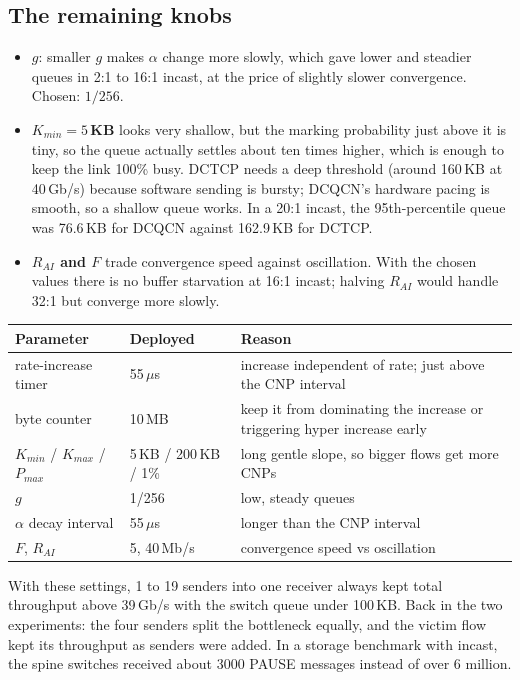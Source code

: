 \subsection{The remaining knobs}
\begin{itemize}
  \item \textbf{$g$}: smaller $g$ makes $\alpha$ change more slowly, which gave lower and steadier queues in 2:1 to 16:1 incast, at the price of slightly
        slower convergence. Chosen: $1/256$.
  \item \textbf{$K_{min} = 5$\,KB} looks very shallow, but the marking probability just above it is tiny, so the queue actually settles about ten times
        higher, which is enough to keep the link 100\% busy. DCTCP needs a deep threshold (around 160\,KB at 40\,Gb/s) because software sending is bursty;
        DCQCN's hardware pacing is smooth, so a shallow queue works. In a 20:1 incast, the 95th-percentile queue was 76.6\,KB for DCQCN against
        162.9\,KB for DCTCP.
  \item \textbf{$R_{AI}$ and $F$} trade convergence speed against oscillation. With the chosen values there is no buffer starvation at 16:1 incast;
        halving $R_{AI}$ would handle 32:1 but converge more slowly.
\end{itemize}

\begin{center}
\begin{tabularx}{\linewidth}{@{}llX@{}}
\toprule
Parameter & Deployed & Reason\\
\midrule
rate-increase timer & 55\,$\mu$s & increase independent of rate; just above the CNP interval\\
byte counter & 10\,MB & keep it from dominating the increase or triggering hyper increase early\\
$K_{min}$ / $K_{max}$ / $P_{max}$ & 5\,KB / 200\,KB / 1\% & long gentle slope, so bigger flows get more CNPs\\
$g$ & 1/256 & low, steady queues\\
$\alpha$ decay interval & 55\,$\mu$s & longer than the CNP interval\\
$F$, $R_{AI}$ & 5, 40\,Mb/s & convergence speed vs oscillation\\
\bottomrule
\end{tabularx}
\end{center}

With these settings, 1 to 19 senders into one receiver always kept total throughput above 39\,Gb/s with the switch queue under 100\,KB. Back in the
two experiments: the four senders split the bottleneck equally, and the victim flow kept its throughput as senders were added. In a storage
benchmark with incast, the spine switches received about 3000 PAUSE messages instead of over 6 million.


